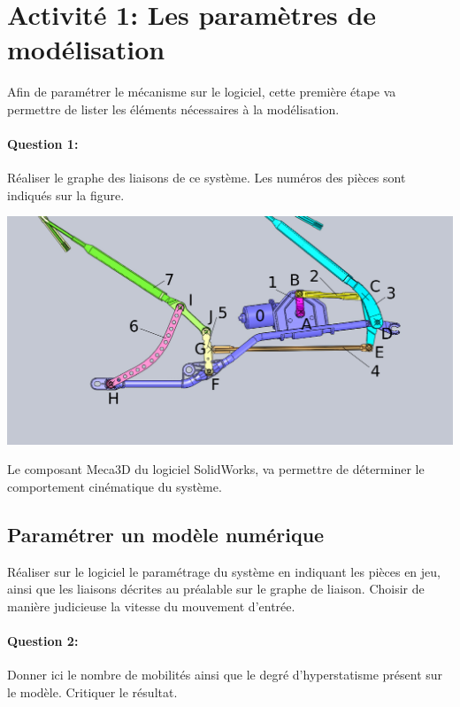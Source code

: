 

\section{Activité 1: Les paramètres de modélisation}

\begin{minipage}{0.45\linewidth}
Afin de paramétrer le mécanisme sur le logiciel, cette première étape va permettre de lister les éléments nécessaires à la modélisation.

\paragraph{Question 1:} Réaliser le graphe des liaisons de ce système. Les numéros des pièces sont indiqués sur la figure. 
\end{minipage}
\hfill
\begin{minipage}{0.48\linewidth}
	\includegraphics[width=0.9\linewidth]{img/essuie_glace_pieces}
\end{minipage}

\vspace{5cm}

Le composant \og Meca3D \fg du logiciel SolidWorks, va permettre de déterminer le comportement cinématique du système.

\subsection{Paramétrer un modèle numérique}

Réaliser sur le logiciel le paramétrage du système en indiquant les pièces en jeu, ainsi que les liaisons décrites au préalable sur le graphe de liaison. Choisir de manière judicieuse la vitesse du mouvement d'entrée.

\paragraph{Question 2:} Donner ici le nombre de mobilités ainsi que le degré d'hyperstatisme présent sur le modèle. Critiquer le résultat.


